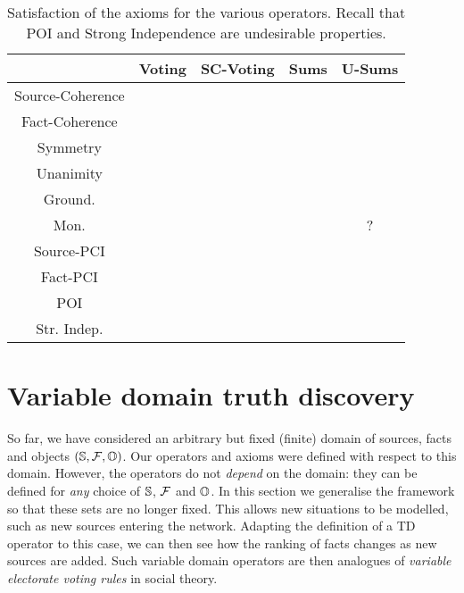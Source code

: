 \begin{table}
\newcommand{\yes}{\checkmark}
\newcommand{\no}{\sffamily{X}}
\newcommand{\notsure}{?}
\centering
    \caption{Satisfaction of the axioms for the various operators. Recall that
    POI and Strong Independence are undesirable properties.}
    \begin{tabular}{c c c c c}
        \toprule
                         & Voting & SC-Voting  & Sums & U-Sums   \\
        \midrule
        Source-Coherence & \no    & \yes       & \yes & \yes     \\
        Fact-Coherence   & \yes   & \no        & \yes & \yes     \\
        Symmetry         & \yes   & \yes       & \yes & \yes     \\
        Unanimity        & \yes   & \yes       & \yes & \yes     \\
        Ground.          & \yes   & \yes       & \yes & \yes     \\
        Mon.             & \yes   & \yes       & \no  & \notsure \\
        Source-PCI       & \yes   & \no        & \no  & \yes     \\
        Fact-PCI         & \yes   & \yes       & \no  & \yes     \\
        \hline
        POI              & \yes   & \yes       & \no  & \no      \\
        Str. Indep.      & \yes   & \yes       & \no  & \no      \\
        \bottomrule
    \end{tabular}
\label{td_table_axioms}
\end{table}

\section{Variable domain truth discovery}
\label{td_sec_variable_domain}

So far, we have considered an arbitrary but fixed (finite) domain of sources,
facts and objects $(\S, \F, \O)$. Our operators and axioms were defined with
respect to this domain. However, the operators do not \emph{depend} on the
domain: they can be defined for \emph{any} choice of $\S$, $\F$ and $\O$. In
this section we generalise the framework so that these sets are no longer
fixed. This allows new situations to be modelled, such as new sources entering
the network. Adapting the definition of a TD operator to this case, we can then
see how the ranking of facts changes as new sources are added. Such variable
domain operators are then analogues of \emph{variable electorate voting rules}
in social theory.

